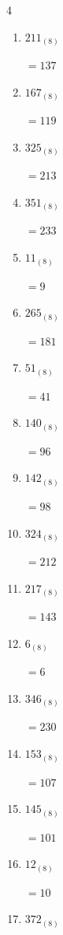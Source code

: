 \begin{multicols}{4}
\begin{enumerate}
  \item $211_{(8)}$

        $=137$

  \item $167_{(8)}$

        $=119$

  \item $325_{(8)}$

        $=213$

  \item $351_{(8)}$

        $=233$

  \item $11_{(8)}$

        $=9$

\columnbreak %

  \item $265_{(8)}$

        $=181$

  \item $51_{(8)}$

        $=41$

  \item $140_{(8)}$

        $=96$

  \item $142_{(8)}$

        $=98$

  \item $324_{(8)}$

        $=212$

  \item $217_{(8)}$

        $=143$

  \item $6_{(8)}$

        $=6$

  \item $346_{(8)}$

        $=230$

  \item $153_{(8)}$

        $=107$

  \item $145_{(8)}$

        $=101$

  \item $12_{(8)}$

        $=10$

  \item $372_{(8)}$


\end{enumerate}
\end{multicols}
